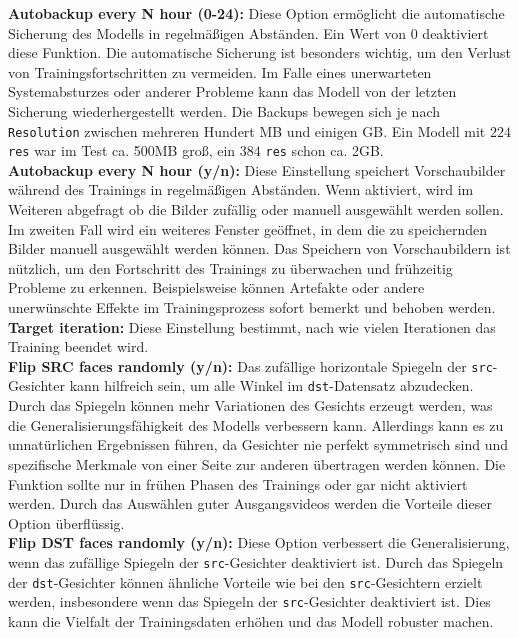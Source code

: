 \textbf{Autobackup every N hour (0-24):} Diese Option ermöglicht die automatische Sicherung des Modells in regelmäßigen Abständen.
Ein Wert von 0 deaktiviert diese Funktion.
Die automatische Sicherung ist besonders wichtig, um den Verlust von Trainingsfortschritten zu vermeiden.
Im Falle eines unerwarteten Systemabsturzes oder anderer Probleme kann das Modell von der letzten Sicherung wiederhergestellt werden.
Die Backups bewegen sich je nach \texttt{Resolution} zwischen mehreren Hundert MB und einigen GB.
Ein Modell mit $224$ \texttt{res} war im Test ca. 500MB groß, ein $384$ \texttt{res} schon ca. 2GB.\\

\textbf{Autobackup every N hour (y/n):} Diese Einstellung speichert Vorschaubilder während des Trainings in regelmäßigen Abständen.
Wenn aktiviert, wird im Weiteren abgefragt ob die Bilder zufällig oder manuell ausgewählt werden sollen.
Im zweiten Fall wird ein weiteres Fenster geöffnet, in dem die zu speichernden Bilder manuell ausgewählt werden können.
Das Speichern von Vorschaubildern ist nützlich, um den Fortschritt des Trainings zu überwachen und frühzeitig Probleme zu erkennen.
Beispielsweise können Artefakte oder andere unerwünschte Effekte im Trainingsprozess sofort bemerkt und behoben werden.\\

\textbf{Target iteration:} Diese Einstellung bestimmt, nach wie vielen Iterationen das Training beendet wird.\\

\textbf{Flip SRC faces randomly (y/n):} Das zufällige horizontale Spiegeln der \texttt{src}-Gesichter kann hilfreich sein, um alle Winkel im \texttt{dst}-Datensatz abzudecken.
Durch das Spiegeln können mehr Variationen des Gesichts erzeugt werden, was die Generalisierungsfähigkeit des Modells verbessern kann.
Allerdings kann es zu unnatürlichen Ergebnissen führen, da Gesichter nie perfekt symmetrisch sind und spezifische Merkmale von einer Seite zur anderen übertragen werden können.
Die Funktion sollte nur in frühen Phasen des Trainings oder gar nicht aktiviert werden.
Durch das Auswählen guter Ausgangsvideos werden die Vorteile dieser Option überflüssig.\\

\textbf{Flip DST faces randomly (y/n):} Diese Option verbessert die Generalisierung, wenn das zufällige Spiegeln der \texttt{src}-Gesichter deaktiviert ist.
Durch das Spiegeln der \texttt{dst}-Gesichter können ähnliche Vorteile wie bei den \texttt{src}-Gesichtern erzielt werden, insbesondere wenn das Spiegeln der \texttt{src}-Gesichter deaktiviert ist.
Dies kann die Vielfalt der Trainingsdaten erhöhen und das Modell robuster machen.\\

